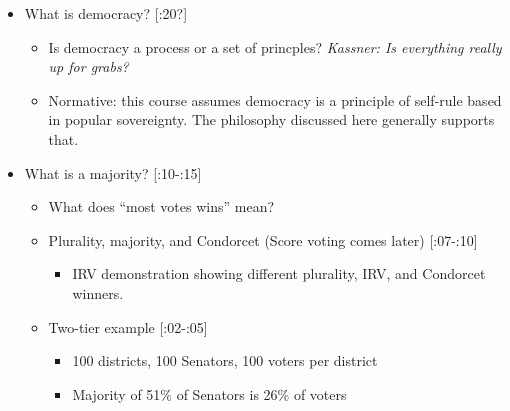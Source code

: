 \begin{itemize}
    \item What is democracy? [:20?]
    \begin{itemize}
        \item Is democracy a process or a set of princples? \emph{Kassner:  Is everything really up for grabs? \autocite{Kassner2006}}

        \item Normative:  this course assumes democracy is a principle of self-rule based in popular sovereignty.  The philosophy discussed here generally supports that.
    \end{itemize}

    \item What is a majority? [:10-:15]
    \begin{itemize}
        \item What does ``most votes wins'' mean?

        \item Plurality, majority, and Condorcet (Score voting comes later) [:07-:10]
        \begin{itemize}
            \item IRV demonstration showing different plurality, IRV, and Condorcet winners.
        \end{itemize}

        \item Two-tier example \autocite[p.125]{Heckelman2015} [:02-:05]
        \begin{itemize}
            \item 100 districts, 100 Senators, 100 voters per district

            \item Majority of 51\% of Senators is 26\% of voters
        \end{itemize}
    \end{itemize}


\end{itemize}
